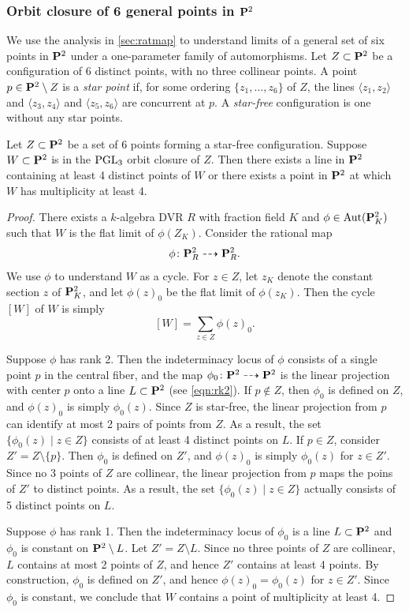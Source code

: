 \documentclass[12pt,reqno]{amsart}
\renewcommand{\k}{k}
\numberwithin{equation}{section}
\begin{document}
\subsubsection{Orbit closure of 6 general points in $\P^2$}\label{sec:orb6}
We use the analysis in \autoref{sec:ratmap} to understand limits of a general set of six points in $\P^2$ under a one-parameter family of automorphisms.
Let $Z \subset \P^2$ be a configuration of 6 distinct points, with no three collinear points.
A point $p \in \P^2 \setminus Z$ is a \emph{star point} if, for some ordering $\{z_1, \dots, z_6\}$ of $Z$, the lines $\langle z_1, z_2 \rangle$ and $\langle  z_3, z_4 \rangle$ and $\langle  z_5, z_6 \rangle$ are concurrent at $p$.
A \emph{star-free} configuration is one without any star points.

\begin{proposition}\label{prop:limit4}
  Let $Z \subset \P^2$ be a set of 6 points forming a star-free configuration.
  Suppose $W \subset \P^2$ is in the $\PGL_3$ orbit closure of $Z$.
  Then there exists a line in $\P^2$ containing at least 4 distinct points of $W$ or there exists a point in $\P^2$ at which $W$ has multiplicity at least 4.
\end{proposition}
\begin{proof}
  There exists a $\k$-algebra DVR $R$ with fraction field $K$ and $\phi \in \Aut(\P^2_K)$ such that $W$ is the flat limit of $\phi(Z_K)$.
  Consider the rational map
  \[ \phi \colon \P^2_R \dashrightarrow \P^2_R.\]
  We use $\phi$ to understand $W$ as a cycle.
  For $z \in Z$, let $z_K$ denote the constant section $z$ of $\P^2_K$, and let $\phi(z)_0$ be the flat limit of $\phi(z_K)$.
  Then the cycle $[W]$ of $W$ is simply
  \[ [W] = \sum_{z \in Z} \phi(z)_0.\]

  Suppose $\phi$ has rank 2.
  Then the indeterminacy locus of $\phi$ consists of a single point $p$ in the central fiber, and the map $\phi_0 \colon \P^2 \dashrightarrow \P^2$
  is the linear projection with center $p$ onto a line $L \subset \P^2$ (see \eqref{eqn:rk2}).
  If $p \not \in Z$, then  $\phi_0$ is defined on $Z$, and $\phi(z)_0$ is simply $\phi_0(z)$.
  Since $Z$ is star-free, the linear projection from $p$ can identify at most 2 pairs of points from $Z$.
  As a result, the set $\{\phi_0(z) \mid z \in Z\}$ consists of at least 4 distinct points on $L$.
  If $p \in Z$, consider $Z' = Z \setminus \{p\}$.
  Then $\phi_0$ is defined on $Z'$, and $\phi(z)_0$ is simply $\phi_0(z)$ for $z \in Z'$.
  Since no 3 points of $Z$ are collinear, the linear projection from $p$ maps the poins of $Z'$ to distinct points.
  As a result, the set $\{\phi_0(z) \mid z \in Z\}$ actually consists of 5 distinct points on $L$.

  Suppose $\phi$ has rank 1.
  Then the indeterminacy locus of $\phi_0$ is a line $L \subset \P^2$ and $\phi_0$ is constant on $\P^2 \setminus L$.
  Let $Z' = Z \setminus L$.
  Since no three points of $Z$ are collinear, $L$ contains at most 2 points of $Z$, and hence $Z'$ contains at least 4 points.
  By construction, $\phi_0$ is defined on $Z'$, and hence $\phi(z)_0 = \phi_0(z)$ for $z \in Z'$.
  Since $\phi_0$ is constant, we conclude that $W$ contains a point of multiplicity at least 4.
\end{proof}
\end{document}
